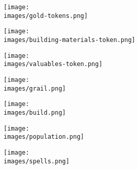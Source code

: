 \begin{figure}[H]
  \centering
  \begin{subfigure}[b]{0.18\linewidth}
    \centering
    \texttt{[image: \\images/gold-tokens.png]}
    \caption{\textbf{} \phantom{Popupulation} \phantom{Popupulation} \phantom{Popupulation}}
  \end{subfigure}
  \begin{subfigure}[b]{0.12\linewidth}
    \centering
    \texttt{[image: \\images/building-materials-token.png]}
    \caption{\textbf{} \phantom{Population}}
  \end{subfigure}
  \begin{subfigure}[b]{0.12\linewidth}
    \centering
    \texttt{[image: \\images/valuables-token.png]}
    \caption{\textbf{} \phantom{Population} \phantom{Population}}
  \end{subfigure}
  \begin{subfigure}[b]{0.15\linewidth}
    \centering
    \texttt{[image: \\images/grail.png]}
    \caption{\textbf{ \phantom{Population} \phantom{Population}}}
  \end{subfigure}
  \begin{subfigure}[b]{0.12\linewidth}
    \centering
    \texttt{[image: \\images/build.png]}
    \caption{\textbf{} \phantom{Population} \phantom{Population}}
  \end{subfigure}
  \begin{subfigure}[b]{0.13\linewidth}
    \centering
    \texttt{[image: \\images/population.png]}
    \caption{\textbf{} \phantom{Population} \phantom{Population}}
  \end{subfigure}
  \begin{subfigure}[b]{0.12\linewidth}
    \centering
    \texttt{[image: \\images/spells.png]}
    \caption{\textbf{} \phantom{Population}}
  \end{subfigure}
\end{figure}
\vspace*{-3.5em}
